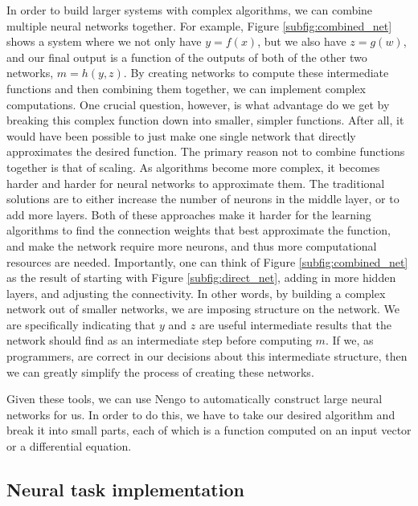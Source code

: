 In order to build larger systems with complex algorithms, we can combine multiple neural networks together.
For example, Figure \ref{subfig:combined_net} shows a system where we not only have $y=f(x)$, but we also have $z=g(w)$, and our final output is a function of the outputs of both of the other two networks, $m=h(y, z)$.
By creating networks to compute these intermediate functions and then combining them together, we can implement complex computations. 
One crucial question, however, is what advantage do we get by breaking this complex function down into smaller, simpler functions. 
After all, it would have been possible to just make one single network that directly approximates the desired function.
The primary reason not to combine functions together is that of scaling. 
As algorithms become more complex, it becomes harder and harder for neural networks to approximate them. 
The traditional solutions are to either increase the number of neurons in the middle layer, or to add more layers. 
Both of these approaches make it harder for the learning algorithms to find the connection weights that best approximate the function, and make the network require more neurons, and thus more computational resources are needed.
Importantly, one can think of Figure \ref{subfig:combined_net} as the result of starting with Figure \ref{subfig:direct_net}, adding in more hidden layers, and adjusting the connectivity. 
In other words, by building a complex network out of smaller networks, we are imposing structure on the network. 
We are specifically indicating that $y$ and $z$ are useful intermediate results that the network should find as an intermediate step before computing $m$. 
If we, as programmers, are correct in our decisions about this intermediate structure, then we can greatly simplify the process of creating these networks.

Given these tools, we can use \ac{Nengo} to automatically construct large neural networks for us. 
In order to do this, we have to take our desired algorithm and break it into small parts, each of which is a function computed on an input vector or a differential equation.

\subsection{Neural task implementation}%
\label{subsec:neural_task_implementation}

